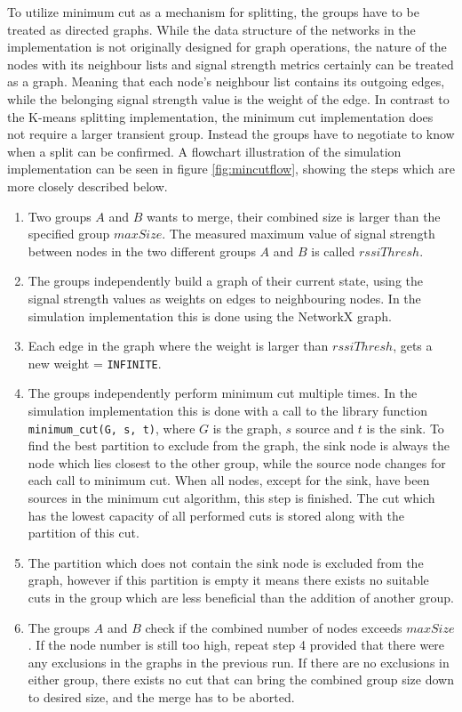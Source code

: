 To utilize minimum cut as a mechanism for splitting, the groups have to be treated as directed graphs. While the data structure of the networks in the implementation is not
originally designed for graph operations, the nature of the nodes with its neighbour lists and signal strength metrics certainly can be treated as a graph. Meaning that each node's neighbour list contains
its outgoing edges, while the belonging signal strength value is the weight of the edge. In contrast to the K-means splitting implementation, the minimum cut implementation does not require
a larger transient group. Instead the groups have to negotiate to know when a split can be confirmed. A flowchart illustration of the simulation implementation can be seen in figure \ref{fig:mincutflow}, showing the steps which are more closely described below. 

\begin{enumerate}
	\item Two groups $A$ and $B$ wants to merge, their combined size is larger than the specified group $maxSize$. The measured maximum value of signal strength between nodes in the two different
		groups $A$ and $B$ is called $rssiThresh$. 
	\item The groups independently build a graph of their current state, using the signal strength values as weights on edges to neighbouring nodes. In the simulation implementation this is done using the NetworkX graph.
	\item Each edge in the graph where the weight is larger than  $rssiThresh$, gets a new weight = \verb|INFINITE|.
	\item The groups independently perform minimum cut multiple times. In the simulation implementation this is done with a call to the library function \newline \verb|minimum_cut(G, s, t)|,
		where $G$ is the graph, $s$ source and $t$ is the sink. To find the best partition to exclude from the graph, the  sink node is always the node which lies closest to the other group,
		while the source node changes for each call to minimum cut. When all nodes, except for the sink, have been sources in the minimum cut algorithm, this step is finished. The cut
		which has the lowest capacity of all performed cuts is stored along with the partition of this cut. 
	\item The partition which does not contain the sink node is excluded from the graph, however if this partition is empty it means there exists no suitable cuts in the group which are less beneficial than the addition of another group. 
	\item The groups $A$ and $B$ check if the combined number of nodes exceeds $maxSize$. If the node number is still too high, repeat step 4 provided that there were any 
		exclusions in the graphs in the previous run. If there are no exclusions in either group, there exists no cut that can bring the combined group size down to desired size, and the
		merge has to be aborted. 
\end{enumerate}

